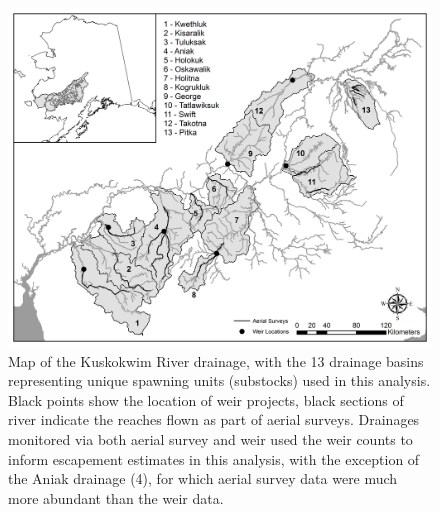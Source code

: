 \documentclass[12pt,]{book}
\theoremstyle{definition}
\theoremstyle{definition}
\theoremstyle{definition}
\theoremstyle{remark}
\begin{document}
\clearpage

\begin{figure}
  \centering
  \includegraphics{img/Ch4/ch4-map.jpg}
  \caption{Map of the Kuskokwim River drainage, with the 13 drainage basins representing unique spawning units (substocks) used in this analysis. Black points show the location of weir projects, black sections of river indicate the reaches flown as part of aerial surveys. Drainages monitored via both aerial survey and weir used the weir counts to inform escapement estimates in this analysis, with the exception of the Aniak drainage (4), for which aerial survey data were much more abundant than the weir data.}
  \label{fig:ch4-map}
\end{figure}

\clearpage
\end{document}
